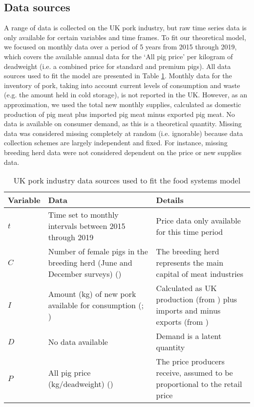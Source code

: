 \documentclass[12pt]{article}
\begin{document}
\subsection{Data sources}
A range of data is collected on the UK pork industry, but raw time series data is only available for certain variables and time frames. To fit our theoretical model, we focused on monthly data over a period of 5 years from 2015 through 2019, which covers the available annual data for the `All pig price' per kilogram of deadweight (i.e. a combined price for standard and premium pigs). All data sources used to fit the model are presented in Table \ref{table_data_sources}. Monthly data for the inventory of pork, taking into account current levels of consumption and waste (e.g. the amount held in cold storage), is not reported in the UK. However, as an approximation, we used the total new monthly supplies, calculated as domestic production of pig meat plus imported pig meat minus exported pig meat. No data is available on consumer demand, as this is a theoretical quantity. Missing data was considered missing completely at random (i.e. ignorable) because data collection schemes are largely independent and fixed. For instance, missing breeding herd data were not considered dependent on the price or new supplies data.


\begin{table}[]
  \centering
  \footnotesize
  \begin{tabular}{p{1.5cm}p{7cm}p{6cm}}
    \textbf{Variable} & \textbf{Data} & \textbf{Details} \\ \hline
    $t$ & Time set to monthly intervals between 2015 through 2019 & Price data only available for this time period \\
    $C$
    & Number of female pigs in the breeding herd (June and December surveys) (\cite{DEFRAlivestocknumbers})
    & The breeding herd represents the main capital of meat industries \\
    $I$
    & Amount (kg) of new pork available for consumption (\cite{DEFRApigcattlestats2020}; \cite{AHDBpigmeatrade})
    & Calculated as UK production (from \cite{DEFRApigcattlestats2020}) plus imports and minus exports (from \cite{AHDBpigmeatrade})  \\
    $D$ & No data available & Demand is a latent quantity \\
    $P$ & All pig price (kg/deadweight) (\cite{DEFRAlivestockprices}) & The price producers receive, assumed to be proportional to the retail price \\ \hline
  \end{tabular}
  \caption{UK pork industry data sources used to fit the food systems model}
  \label{table_data_sources}
\end{table}
\end{document}
